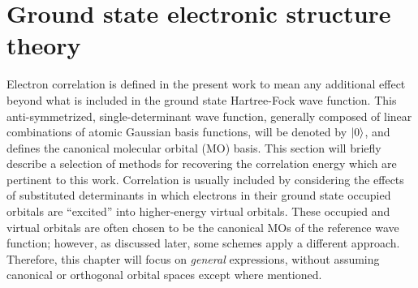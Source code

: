 \section{Ground state electronic structure theory} \label{se:est}
Electron correlation is defined in the present work to mean any additional effect beyond what is
included in the ground state Hartree-Fock wave function. This anti-symmetrized, 
single-determinant wave function, generally composed of linear combinations of atomic Gaussian basis functions, will be denoted by $| 0 \rangle$, and defines the canonical molecular orbital (MO) basis. 
This section will briefly describe a selection of methods for recovering the correlation energy which are
pertinent to this work.
Correlation is usually included by considering the effects of substituted determinants in which electrons
in their ground state occupied orbitals are ``excited'' into higher-energy virtual orbitals. These 
occupied and virtual orbitals are often chosen to be the canonical MOs of the reference 
wave function; however, as discussed later, some schemes apply a different approach. Therefore, this 
chapter will focus on \textit{general} expressions, without assuming canonical or orthogonal orbital
spaces except where mentioned.   

